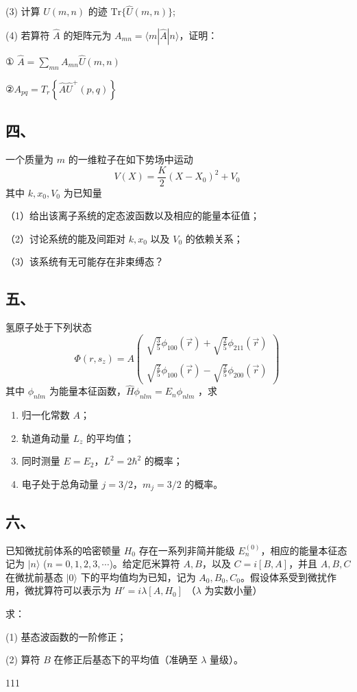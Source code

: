 (3) 计算 $\hat{U}(m,n)$ 的迹 $\mathrm{Tr}\{\hat{U}(m,n)\}$;

(4) 若算符 $\hat{A}$ 的矩阵元为 $A_{mn} = \langle m|\hat{A}|n\rangle$，证明：

① $\hat{A} =\sum_{mn} A_{mn} \hat{U}(m,n)$

②$A_{pq} =T_r\left\{\hat{A}\hat{U}^+(p,q)\right\}$
\subsection{四、}
一个质量为 $m$ 的一维粒子在如下势场中运动
$$V(X)=\frac{K}{2}(X-X_0)^2+V_0~$$
其中 $k, x_0, V_0$ 为已知量

（1）给出该离子系统的定态波函数以及相应的能量本征值；

（2）讨论系统的能及间距对 $k,x_0$ 以及 $V_0$ 的依赖关系；

（3）该系统有无可能存在非束缚态？
\subsection{五、}
氢原子处于下列状态
$$\Phi(r, s_z) = A \begin{pmatrix}
\sqrt{\frac{3}{5}} \phi_{100}(\vec{r}) + \sqrt{\frac{2}{5}} \phi_{211}(\vec{r}) \\\\
\sqrt{\frac{2}{5}} \phi_{100}(\vec{r}) - \sqrt{\frac{2}{5}} \phi_{200}(\vec{r})
\end{pmatrix}~
$$
其中 $\phi_{nlm}$ 为能量本征函数，$\hat{H} \phi_{nlm} = E_n \phi_{nlm}$ ，求

\begin{enumerate}
  \item 归一化常数 $A$；
  \item 轨道角动量 $L_z$ 的平均值；
  \item 同时测量 $E = E_2$，$L^2 = 2\hbar^2$ 的概率；
  \item 电子处于总角动量 $j = 3/2$，$m_j = 3/2$ 的概率。
\end{enumerate}
\subsection{六、}
已知微扰前体系的哈密顿量 $H_0$ 存在一系列非简并能级 $E_n^{(0)}$，相应的能量本征态记为 $|n\rangle$ ($n = 0, 1, 2, 3, \cdots$)。给定厄米算符 $A, B$，以及 $C = i[B, A]$，并且 $A, B, C$ 在微扰前基态 $|0\rangle$ 下的平均值均为已知，记为 $A_0, B_0, C_0$。假设体系受到微扰作用，微扰算符可以表示为 $H' = i\lambda[A, H_0]$ （$\lambda$ 为实数小量）

求：

(1) 基态波函数的一阶修正；

(2) 算符 $B$ 在修正后基态下的平均值（准确至 $\lambda$ 量级）。

\begin{exercise}{111}

\end{exercise}